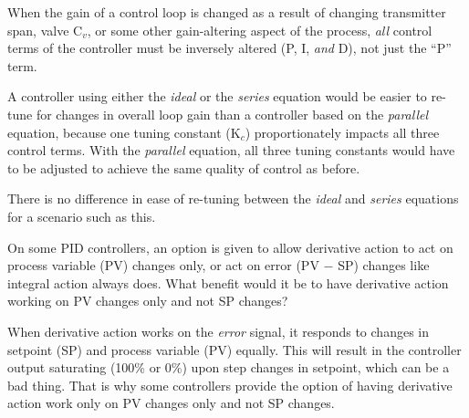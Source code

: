 \vskip 10pt

When the gain of a control loop is changed as a result of changing transmitter span, valve C$_{v}$, or some other gain-altering aspect of the process, {\it all} control terms of the controller must be inversely altered (P, I, {\it and} D), not just the ``P'' term.  

A controller using either the {\it ideal} or the {\it series} equation would be easier to re-tune for changes in overall loop gain than a controller based on the {\it parallel} equation, because one tuning constant (K$_{c}$) proportionately impacts all three control terms.  With the {\it parallel} equation, all three tuning constants would have to be adjusted to achieve the same quality of control as before.  

There is no difference in ease of re-tuning between the {\it ideal} and {\it series} equations for a scenario such as this.






On some PID controllers, an option is given to allow derivative action to act on process variable (PV) changes only, or act on error (PV $-$ SP) changes like integral action always does.  What benefit would it be to have derivative action working on PV changes only and not SP changes?







When derivative action works on the {\it error} signal, it responds to changes in setpoint (SP) and process variable (PV) equally.  This will result in the controller output saturating (100\% or 0\%) upon step changes in setpoint, which can be a bad thing.  That is why some controllers provide the option of having derivative action work only on PV changes only and not SP changes.

